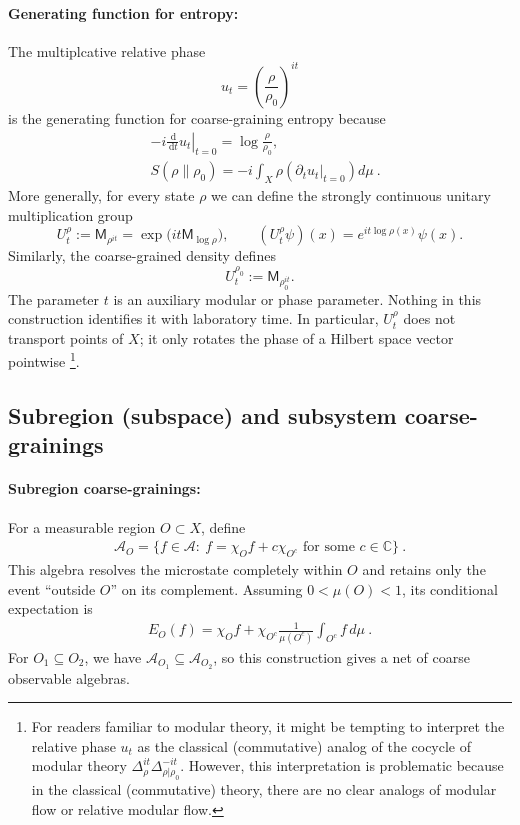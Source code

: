 \documentclass[a4paper,11pt]{article}
\theoremstyle{definition}
\newcommand{\dd}{\,\mathrm{d}}
\newcommand{\Mop}{\mathsf{M}}
\newcommand{\mA}{\mathcal{A}}
\newcommand{\nn}{\nonumber}
\begin{document}
\paragraph{Generating function for entropy:} The multiplcative relative phase 
\[
u_t
=
\left(\frac{\rho}{\rho_0}\right)^{it}
\]
is the generating function for coarse-graining entropy because 
\begin{align}
&-i\left.\frac{\dd}{\dd t}u_t\right|_{t=0}
=
\log\frac{\rho}{\rho_0},\nn\\
&S(\rho\|\rho_0)=-i \int_X \rho (\partial_t u_t\big|_{t=0})d\mu\ .
\end{align}
More generally, for every state $\rho$ we can define the strongly continuous unitary multiplication group
\[
  U_t^\rho:=\Mop_{\rho^{it}}
  =\exp\!\bigl(it\Mop_{\log\rho}\bigr),
  \qquad
  (U_t^\rho\psi)(x)=e^{it\log\rho(x)}\psi(x).
\]
Similarly, the coarse-grained density defines
\[
  U_t^{\rho_0}:=\Mop_{\rho_0^{it}}.
\]
The parameter $t$ is an auxiliary modular or phase parameter.  Nothing in this construction identifies it with laboratory time.  In particular, $U_t^\rho$ does not transport points of $X$; it only rotates the phase of a Hilbert space vector pointwise \footnote{For readers familiar to modular theory, it might be tempting to interpret the relative phase $u_t$ as the classical (commutative) analog of the cocycle of modular theory $\Delta_\rho^{it}\Delta_{\rho|\rho_0}^{-it}$. However, this interpretation is problematic because in the classical (commutative) theory, there are no clear analogs of modular flow or relative modular flow.}.

\subsection{Subregion (subspace) and subsystem coarse-grainings}
\label{subsec:classical-region-subsystem}

\paragraph{Subregion coarse-grainings:}
For a measurable region $O\subset X$, define
\begin{align}
    \mA_O=\{f\in\mA:\ f=\chi_O f+c\chi_{O^c}\text{ for some }c\in\mathbb C\}\ .
\end{align}
This algebra resolves the microstate completely within $O$ and retains only the event ``outside $O$'' on its complement. Assuming $0<\mu(O)<1$, its conditional expectation is
\begin{align}
    E_O(f)=\chi_O f+
    \chi_{O^c}\frac{1}{\mu(O^c)}\int_{O^c}f\,d\mu\ .
\end{align}
For $O_1\subseteq O_2$, we have $\mA_{O_1}\subseteq\mA_{O_2}$, so this construction gives a net of coarse observable algebras.
\end{document}

